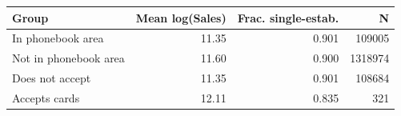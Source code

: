 \begin{tabular}[t]{lrrr}
\toprule
Group & Mean log(Sales) & Frac. single-estab. & N\\
\midrule
In phonebook area & 11.35 & 0.901 & 109005\\
Not in phonebook area & 11.60 & 0.900 & 1318974\\
Does not accept & 11.35 & 0.901 & 108684\\
Accepts cards & 12.11 & 0.835 & 321\\
\bottomrule
\end{tabular}
